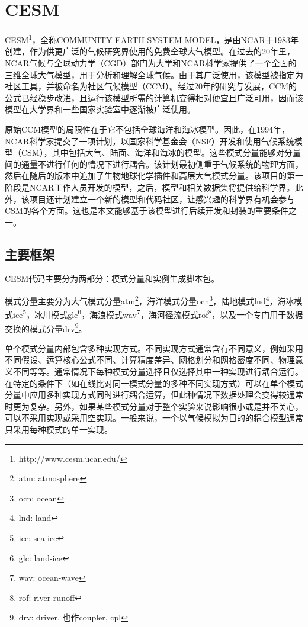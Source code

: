 \section{CESM}

CESM\texttrademark\footnote{http://www.cesm.ucar.edu/}，全称COMMUNITY EARTH SYSTEM MODEL，是由NCAR于1983年创建，作为供更广泛的气候研究界使用的免费全球大气模型。在过去的20年里，NCAR气候与全球动力学（CGD）部门为大学和NCAR科学家提供了一个全面的三维全球大气模型，用于分析和理解全球气候。由于其广泛使用，该模型被指定为社区工具，并被命名为社区气候模型（CCM）。经过20年的研究与发展，CCM的公式已经稳步改进，且运行该模型所需的计算机变得相对便宜且广泛可用，因而该模型在大学界和一些国家实验室中逐渐被广泛使用。

原始CCM模型的局限性在于它不包括全球海洋和海冰模型。因此，在1994年，NCAR科学家提交了一项计划，以国家科学基金会（NSF）开发和使用气候系统模型（CSM），其中包括大气、陆面、海洋和海冰的模型。这些模式分量能够对分量间的通量不进行任何的情况下进行耦合。该计划最初侧重于气候系统的物理方面，然后在随后的版本中追加了生物地球化学插件和高层大气模式分量。该项目的第一阶段是NCAR工作人员开发的模型，之后，模型和相关数据集将提供给科学界。此外，该项目还计划建立一个新的模型和代码社区，让感兴趣的科学界有机会参与CSM的各个方面。这也是本文能够基于该模型进行后续开发和封装的重要条件之一。

\subsection{主要框架}

CESM代码主要分为两部分：模式分量和实例生成脚本包。

模式分量主要分为大气模式分量atm\footnote {atm: atmosphere}，海洋模式分量ocn\footnote {ocn: ocean}，陆地模式lnd\footnote {lnd: land}，海冰模式ice\footnote {ice: sea-ice}，冰川模式glc\footnote {glc: land-ice}，海浪模式wav\footnote {wav: ocean-wave}，海河径流模式rof\footnote {rof: river-runoff}，以及一个专门用于数据交换的模式分量drv\footnote {drv: driver, 也作coupler, cpl}。

单个模式分量内部包含多种实现方式。不同实现方式通常含有不同意义，例如采用不同假设、运算核心公式不同、计算精度差异、网格划分和网格密度不同、物理意义不同等等。通常情况下每种模式分量选择且仅选择其中一种实现进行耦合运行。在特定的条件下（如在线比对同一模式分量的多种不同实现方式）可以在单个模式分量中应用多种实现方式同时进行耦合运算，但此种情况下数据处理会变得较通常时更为复杂。另外，如果某些模式分量对于整个实验来说影响很小或是并不关心，可以不采用实现或采用空实现。一般来说，一个以气候模拟为目的的耦合模型通常只采用每种模式的单一实现。

